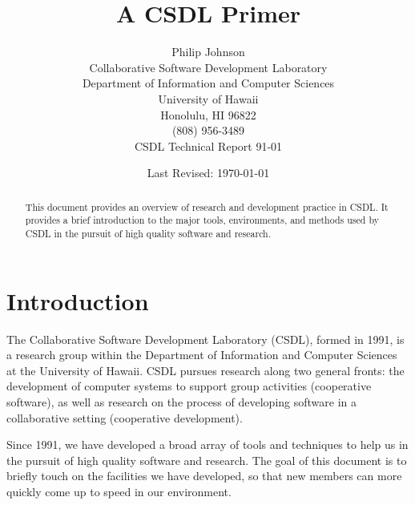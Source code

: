 




\title{{\bf A CSDL Primer}}
\author {Philip Johnson\\
Collaborative Software Development Laboratory\\ 
Department of Information and Computer Sciences\\
University of Hawaii\\
Honolulu, HI 96822\\
(808) 956-3489\\
CSDL Technical Report 91-01}

\date{Last Revised: \today}

\maketitle

\begin{abstract}

This document provides an overview of research and development
practice in CSDL.  It provides a brief introduction to the major
tools, environments, and methods used by CSDL in the pursuit of high
quality software and research.

\end{abstract}

\newpage
\tableofcontents

\newpage 
\section{Introduction}

The Collaborative Software Development Laboratory (CSDL), formed in
1991, is a research group within the Department of Information and
Computer Sciences at the University of Hawaii.  CSDL pursues research
along two general fronts: the development of computer systems to
support group activities (cooperative software), as well as research
on the process of developing software in a collaborative setting
(cooperative development).

Since 1991, we have developed a broad array of tools and techniques to
help us in the pursuit of high quality software and research.  The
goal of this document is to briefly touch on the facilities we have
developed, so that new members can more quickly come up to speed in
our environment.

